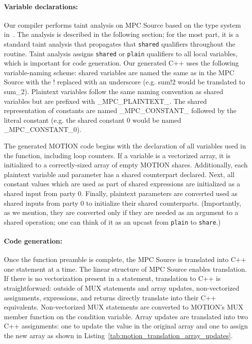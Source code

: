 \paragraph{Variable declarations:}
Our compiler performs taint analysis on MPC Source based on the type system in~. The analysis is described in the following section;
for the most part, it is a standard taint analysis that propagates that \texttt{shared} qualifiers throughout the routine.
Taint analysis assigns \texttt{shared} or \texttt{plain} qualifiers to all local variables, which is important for code generation.
Our generated C++ uses the following variable-naming scheme: shared variables are named the same as in the MPC Source with the {\sf !} replaced with an underscore (e.g. {\sf sum!2} would be translated to {\sf sum\_2}). Plaintext variables follow the same naming convention as shared variables but are prefixed with {\sf \_MPC\_PLAINTEXT\_}.  The shared representation of constants are named {\sf \_MPC\_CONSTANT\_} followed by the literal constant (e.g. the shared constant 0 would be named {\sf \_MPC\_CONSTANT\_0}).

The generated MOTION code begins with the declaration of all variables used in the function, including loop counters.  If a variable is a vectorized array, it is initialized to a correctly-sized array of empty MOTION shares.  Additionally, each plaintext variable and parameter has a shared counterpart declared.  Next, all constant values which are used as part of shared expressions are initialized as a shared input from party 0.  Finally, plaintext parameters are converted used as shared inputs from party 0 to initialize their shared counterparts. (Importantly, as we mention, they are converted only if they are needed as an argument to a shared operation; one can think of it as an upcast from \texttt{plain} to \texttt{share}.)

\paragraph{Code generation:}
Once the function preamble is complete, the MPC Source is translated into C++ one statement at a time. The linear structure of MPC Source enables translation. If there is no vectorization present in a statement, translation to C++ is straightforward: outside of MUX statements and array updates, non-vectorized assignments, expressions, and returns directly translate into their C++ equivalents.  Non-vectorized MUX statements are converted to MOTION's MUX member function on the condition variable.  Array updates are translated into two C++ assignments: one to update the value in the original array and one to assign the new array as shown in Listing~\ref{tab:motion_translation_array_updates}.


